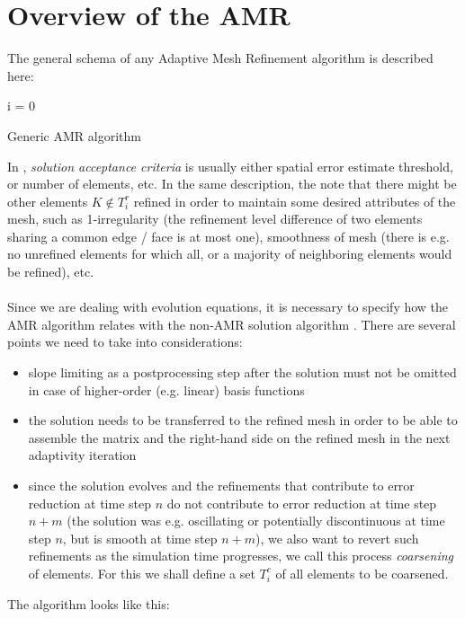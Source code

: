 \section{Overview of the AMR}
The general schema of any Adaptive Mesh Refinement algorithm is described here:
\begin{algorithm}[H]
\label{AMRGen}
 i = 0\\
 \caption{Generic AMR algorithm}
\end{algorithm}
In , \textit{solution acceptance criteria} is usually either spatial error estimate threshold, or number of elements, etc. In the same description, the note that there might be other elements $K \notin T^{r}_i$ refined in order to maintain some desired attributes of the mesh, such as 1-irregularity (the refinement level difference of two elements sharing a common edge / face is at most one), smoothness of mesh (there is e.g. no unrefined elements for which all, or a majority of neighboring elements would be refined), etc.

\paragraph{}
Since we are dealing with evolution equations, it is necessary to specify how the AMR algorithm relates with the non-AMR solution algorithm . There are several points we need to take into considerations:
\begin{itemize}
	\item slope limiting as a postprocessing step after the solution must not be omitted in case of higher-order (e.g. linear) basis functions
	\item the solution needs to be transferred to the refined mesh in order to be able to assemble the matrix and the right-hand side on the refined mesh in the next adaptivity iteration
	\item since the solution evolves and the refinements that contribute to error reduction at time step $n$ do not contribute to error reduction at time step $n + m$ (the solution was e.g. oscillating or potentially discontinuous at time step $n$, but is smooth at time step $n + m$), we also want to revert such refinements as the simulation time progresses, we call this process \textit{coarsening} of elements. For this we shall define a set $T^{c}_i$ of all elements to be coarsened.
\end{itemize}
The algorithm looks like this:

